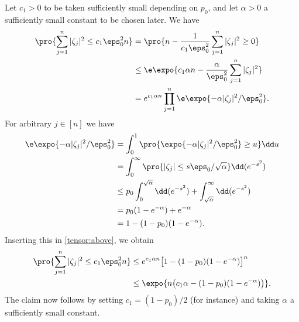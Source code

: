 \documentclass[aop,preprint]{imsart}
\theoremstyle{plain}
\theoremstyle{definition}
\theoremstyle{remark}
\numberwithin{equation}{section}
\numberwithin{theorem}{section}
\begin{document}
Let $c_1>0$ to be taken sufficiently small depending on $p_0$, and let $\alpha>0$ a sufficiently small constant to be chosen later.
We have
\begin{align}
\pro{ \sum_{j=1}^n |\zeta_j|^2 \le c_1\eps_0^2 n} 
&= \pro{ n- \frac1{c_1\eps_0^2} \sum_{j=1}^n |\zeta_j|^2 \ge 0}	\notag\\
&\le \e \expo{ c_1\alpha n - \frac{\alpha}{\eps_0^2} \sum_{j=1}^n |\zeta_j|^2 } \notag\\
%
&= e^{c_1\alpha n} \prod_{j=1}^n \e \expo{ -\alpha |\zeta_j|^2/\eps_0^2}.	\label{tensor:above}
\end{align}
For arbitrary $j\in [n]$ we have
\begin{align*}
\e \expo{ -\alpha |\zeta_j|^2/\eps_0^2}
&= \int_0^1 \pro{ \expo{-\alpha|\zeta_j|^2/\eps_0^2 } \ge u} \dd u\\
&= \int_0^\infty \pro{ |\zeta_j| \le s\eps_0/\sqrt{\alpha}} \dd (e^{-s^2})\\
&\le p_0\int_0^{\sqrt{\alpha}} \dd(e^{-s^2}) + \int_{\sqrt{\alpha}}^\infty \dd(e^{-s^2})\\
&= p_0(1-e^{-\alpha}) + e^{-\alpha}\\
&= 1- (1-p_0)(1-e^{-\alpha}).
\end{align*}
Inserting this in \eqref{tensor:above}, we obtain
\begin{align*}
\pro{ \sum_{j=1}^n |\zeta_j|^2 \le c_1\eps_0^2 n} 
&\le e^{c_1\alpha n} \big[ 1- (1-p_0)(1-e^{-\alpha}) \big]^n\\
&\le \expo{ n\big(c_1\alpha - (1-p_0)(1-e^{-\alpha})\big)}.
\end{align*}
The claim now follows by setting $c_1=(1-p_0)/2$ (for instance) and taking $\alpha$ a sufficiently small constant.  















\end{document}
